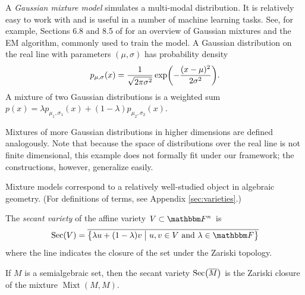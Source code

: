\documentclass[11pt,titlepage]{article}
\newcommand*{\vbar}{\;\big\vert\;}
\DeclareMathOperator{\Mixt}{Mixt}
\DeclareMathOperator{\Sec}{Sec}
\numberwithin{equation}{section}
\begin{document}
    \begin{example}
    A \emph{Gaussian mixture model} simulates a multi-modal distribution.  It is
    relatively easy to work with and is useful in a number of machine learning
    tasks.  See, for example, Sections 6.8 and 8.5 of \cite{EOSL} for an
    overview of Gaussian mixtures and the EM algorithm, commonly used to train
    the model.  A Gaussian distribution on the real line with parameters $(\mu,
    \sigma)$ has probability density
    \[
        p_{\mu, \sigma}(x) = \frac{1}{\sqrt{2\pi\sigma^2}} 
        \exp\pdil*{-\frac{(x - \mu)^2}{2\sigma^2}}.
    \]
    A mixture of two Gaussian distributions is a weighted sum $p(x) = \lambda
    p_{\mu_1, \sigma_1}(x) + (1 - \lambda)p_{\mu_2, \sigma_2}(x)$.  
    \begin{center}
    \end{center}
    Mixtures of more Gaussian distributions in higher dimensions are defined
    analogously.  Note that because the space of distributions over the real
    line is not finite dimensional, this example does not formally fit under our
    framework; the constructions, however, generalize easily.
    \end{example}

    Mixture models correspond to a relatively well-studied object in algebraic
    geometry.  (For definitions of terms, see Appendix \ref{sec:varieties}.)
    \begin{definition}
    The \emph{secant variety} of the affine variety $V \subset \F^n$ is
    \[
        \Sec(V) = \overline{\cdil[\big]{
        \lambda u + (1 - \lambda) v \vbar
        u,v \in V
        \text{ and }
        \lambda \in \F
        }}
    \]
    where the line indicates the closure of the set under the Zariski topology.  
    \end{definition}
    \begin{proposition}
    If $M$ is a semialgebraic set, then the secant variety
    $\Sec\pdil[\big]{\overline{M}}$ is the Zariski closure of the mixture
    $\Mixt(M, M)$.
    \end{proposition}
\end{document}
